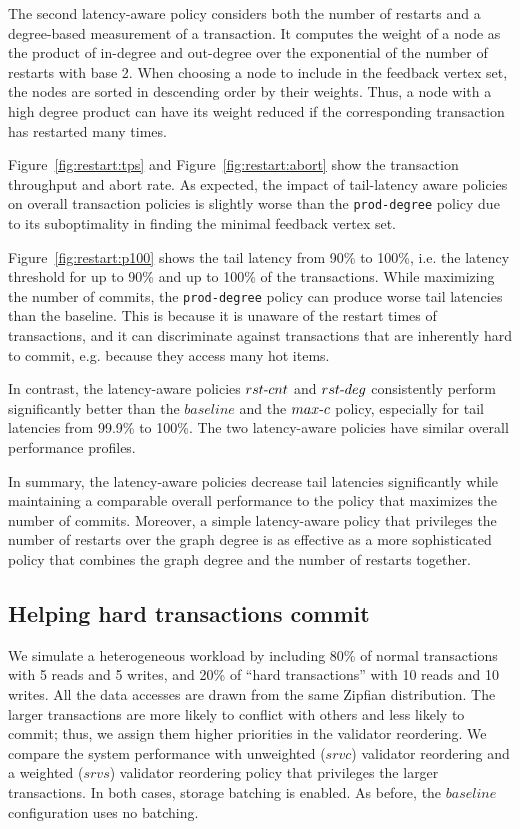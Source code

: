 The second latency-aware policy considers both the number of restarts and a degree-based measurement of a transaction. It computes the weight of a node as the product of in-degree and out-degree over the exponential of the number of restarts with base 2. When choosing a node to include in the feedback vertex set, the nodes are sorted in descending order by their weights. Thus, a node with a high degree product can have its weight reduced if the corresponding transaction has restarted many times.

Figure~\ref{fig:restart:tps} and Figure~\ref{fig:restart:abort} show the transaction throughput and abort rate. As expected, the impact of tail-latency aware policies on overall transaction policies is slightly worse than the \texttt{prod-degree} policy due to its suboptimality in finding the minimal feedback vertex set.

Figure~\ref{fig:restart:p100} shows the tail latency from 90\% to 100\%, i.e. the latency threshold for up to 90\% and up to 100\% of the transactions. While maximizing the number of commits, the \texttt{prod-degree} policy can produce worse tail latencies than the baseline. This is because it is unaware of the restart times of transactions, and it can discriminate against transactions that are inherently hard to commit, e.g. because they access many hot items.

In contrast, the latency-aware policies $rst\hbox{-}cnt$ and $rst\hbox{-}deg$ consistently perform significantly better than the $baseline$ and the $max\hbox{-}c$ policy, especially for tail latencies from 99.9\% to 100\%. The two latency-aware policies have similar overall performance profiles. 

In summary, the latency-aware policies decrease tail latencies significantly while maintaining a comparable overall performance to the policy that maximizes the number of commits. Moreover, a simple latency-aware policy that privileges the number of restarts over the graph degree is as effective as a more sophisticated policy that combines the graph degree and the number of restarts together.


\subsection{Helping hard transactions commit}

We simulate a heterogeneous workload by including 80\% of normal transactions with 5 reads and 5 writes, and 20\% of ``hard transactions'' with 10 reads and 10 writes. All the data accesses are drawn from the same Zipfian distribution. The larger transactions are more likely to conflict with others and less likely to commit; thus, we assign them higher priorities in the validator reordering. We compare the system performance with unweighted ($srvc$) validator reordering and a weighted ($srvs$) validator reordering policy that privileges the larger transactions. In both cases, storage batching is enabled. As before, the $baseline$ configuration uses no batching.

